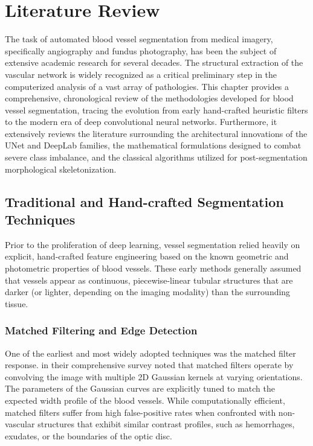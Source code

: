 \chapter{Literature Review}
\label{ch:literature_review}

The task of automated blood vessel segmentation from medical imagery, specifically angiography and fundus photography, has been the subject of extensive academic research for several decades. The structural extraction of the vascular network is widely recognized as a critical preliminary step in the computerized analysis of a vast array of pathologies. This chapter provides a comprehensive, chronological review of the methodologies developed for blood vessel segmentation, tracing the evolution from early hand-crafted heuristic filters to the modern era of deep convolutional neural networks. Furthermore, it extensively reviews the literature surrounding the architectural innovations of the UNet and DeepLab families, the mathematical formulations designed to combat severe class imbalance, and the classical algorithms utilized for post-segmentation morphological skeletonization.

\section{Traditional and Hand-crafted Segmentation Techniques}
Prior to the proliferation of deep learning, vessel segmentation relied heavily on explicit, hand-crafted feature engineering based on the known geometric and photometric properties of blood vessels. These early methods generally assumed that vessels appear as continuous, piecewise-linear tubular structures that are darker (or lighter, depending on the imaging modality) than the surrounding tissue.

\subsection{Matched Filtering and Edge Detection}
One of the earliest and most widely adopted techniques was the matched filter response. \textcite{fraz2012blood} in their comprehensive survey noted that matched filters operate by convolving the image with multiple 2D Gaussian kernels at varying orientations. The parameters of the Gaussian curves are explicitly tuned to match the expected width profile of the blood vessels. While computationally efficient, matched filters suffer from high false-positive rates when confronted with non-vascular structures that exhibit similar contrast profiles, such as hemorrhages, exudates, or the boundaries of the optic disc.

